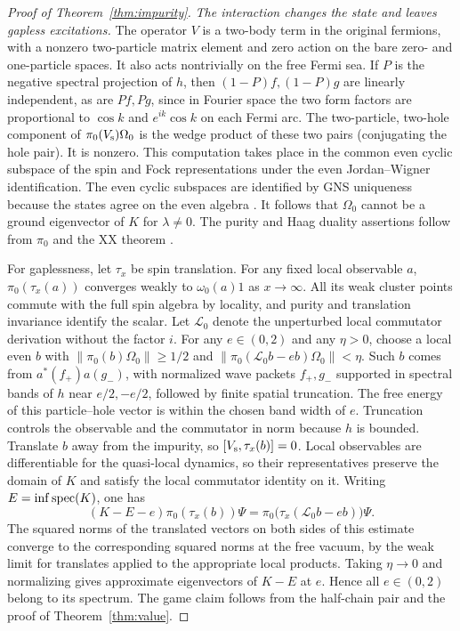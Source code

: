 \begin{proof}[Proof of Theorem~\ref{thm:impurity}]
\emph{The interaction changes the state and leaves gapless excitations.}
The operator $V$ is a two-body term in the original fermions, with a nonzero
two-particle matrix element and zero action on the bare zero- and one-particle
spaces. It also acts nontrivially on the free Fermi sea. If $P$ is the negative
spectral projection of $h$, then $(1-P)f,(1-P)g$ are linearly independent, as
are $Pf,Pg$, since in Fourier space the two form factors are proportional to
$\cos k$ and $e^{ik}\cos k$ on each Fermi arc. The two-particle, two-hole
component of $\pi_0(V_{\rm s})\Omega_0$ is the wedge product of these two
pairs (conjugating the hole pair). It is nonzero. This computation takes place
in the common even cyclic subspace of the spin and Fock representations
under the even Jordan--Wigner identification. The even cyclic subspaces
are identified by GNS uniqueness because the states agree on the even
algebra \cite[Sec.~6.2]{KMSW}.
It follows that $\Omega_0$ cannot be a ground eigenvector of $K$ for
$\lambda\ne0$. The purity and Haag duality assertions follow from
$\pi_0$ and the XX theorem \cite{vLSW25}.

For gaplessness, let $\tau_x$ be spin translation. For any fixed local
observable $a$, $\pi_0(\tau_x(a))$ converges weakly to $\omega_0(a)1$ as
$x\to\infty$. All its weak cluster points commute with the full spin algebra
by locality, and purity and translation invariance identify the scalar.
Let $\mathcal L_0$ denote the unperturbed local commutator derivation without
the factor $i$. For any $e\in(0,2)$ and any $\eta>0$, choose a local even
$b$ with $\|\pi_0(b)\Omega_0\|\geq1/2$ and
$\|\pi_0(\mathcal L_0 b-e b)\Omega_0\|<\eta$. Such $b$ comes from
$a^*(f_+)a(g_-)$, with normalized wave packets $f_+,g_-$ supported in
spectral bands of $h$ near $e/2,-e/2$, followed by finite spatial truncation.
The free energy of this particle--hole vector is within the chosen band width
of $e$. Truncation controls the observable and the commutator in norm because
$h$ is bounded. Translate $b$ away from the impurity, so
$[V_{\rm s},\tau_x(b)]=0$. Local observables are differentiable for the
quasi-local dynamics, so their representatives preserve the domain of $K$
and satisfy the local commutator identity on it. Writing $E=\inf\operatorname{spec}(K)$,
one has
\[
 (K-E-e)\pi_0(\tau_x(b))\Psi
 =\pi_0\bigl(\tau_x(\mathcal L_0 b-e b)\bigr)\Psi.
\]
The squared norms of the translated vectors on both sides of this estimate
converge to the corresponding squared norms at the free vacuum, by the
weak limit for translates applied to the appropriate local products.
Taking $\eta\to0$ and normalizing gives approximate eigenvectors of $K-E$
at $e$. Hence all $e\in(0,2)$ belong to its spectrum. The game claim follows from the half-chain pair and the proof of Theorem~\ref{thm:value}.
\end{proof}

